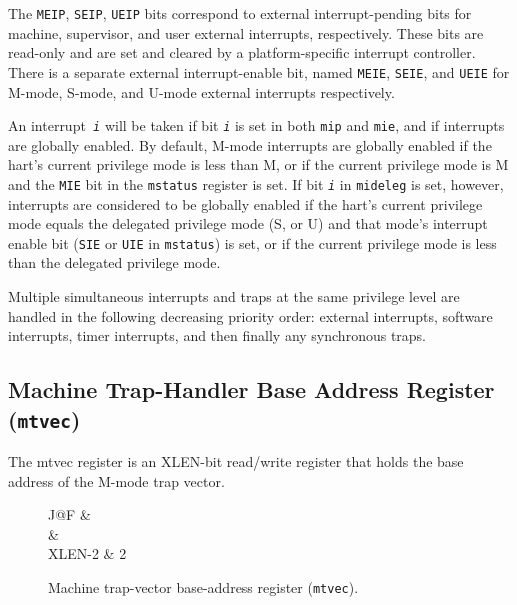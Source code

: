 The \texttt{MEIP}, \texttt{SEIP}, \texttt{UEIP} bits correspond to external interrupt-pending bits for machine, supervisor, and user external interrupts, 
respectively. These bits are read-only and are set and cleared by a platform-specific
interrupt controller. There is a separate external interrupt-enable bit,
named \texttt{MEIE}, \texttt{SEIE}, and \texttt{UEIE} for M-mode, S-mode, 
and U-mode external interrupts respectively.

An interrupt\texttt{ \emph{i}} will be taken if bit \texttt{\emph{i}} is set in 
both \texttt{mip} and \texttt{mie}, and if interrupts are globally enabled. By default,
M-mode interrupts are globally enabled if the hart's current privilege mode is
less than M, or if the current privilege mode is M and the \texttt{MIE} bit in
the \texttt{mstatus} register is set. If bit \texttt{\emph{i}} in \texttt{mideleg} is 
set, however, interrupts are considered to be globally enabled if the hart's current
privilege mode equals the delegated privilege mode (S, or U) and that
mode's interrupt enable bit (\texttt{SIE} or \texttt{UIE} in \texttt{mstatus}) is 
set, or if the current privilege mode is less than the delegated privilege mode.

Multiple simultaneous interrupts and traps at the same privilege level
are handled in the following decreasing priority order: external
interrupts, software interrupts, timer interrupts, and then finally any
synchronous traps.

\subsection{Machine Trap-Handler Base Address Register
(\texttt{mtvec})}\label{machine-trap-handler-base-address-register-mtvec}

The mtvec register is an XLEN-bit read/write register that holds the
base address of the M-mode trap vector.

\begin{figure*}[h!]
	{\footnotesize
		\begin{center}
			\begin{tabular}{J@{}F}
				 &
				 \\
				\hline
				 & 
				 \\
				\hline
				XLEN-2 & 2 \\
			\end{tabular}
		\end{center}
	}
	\vspace{-0.1in}
	\caption{Machine trap-vector base-address register ({\tt mtvec}).}
	\label{fig:mtvecreg}
\end{figure*}

